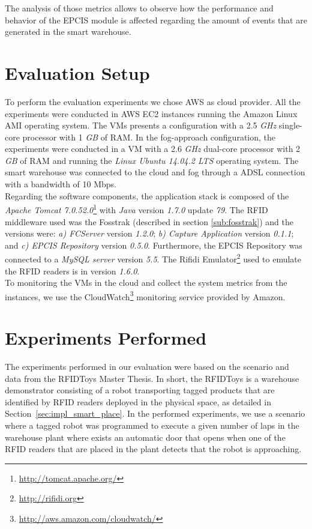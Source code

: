 The analysis of those metrics allows to observe how the performance and behavior of the \gls{EPCIS}
module is affected regarding the amount of events that are generated in the smart warehouse.

\section{Evaluation Setup}
\label{sec:eval_setup}
To perform the evaluation experiments we chose \gls{AWS} as cloud provider. All the experiments were
conducted in \gls{AWS} \gls{EC2} instances running the Amazon Linux \gls{AMI} operating system. The \glspl{VM}
presents a configuration with a 2.5 \textit{\gls{GHz}} single-core processor with 1 \textit{\gls{GB}} of
\gls{RAM}. In the fog-approach configuration, the experiments were conducted in a \gls{VM} with
a 2.6 \textit{\gls{GHz}} dual-core processor with 2 \textit{\gls{GB}} of \gls{RAM} and running
the \textit{Linux Ubuntu 14.04.2 LTS} operating system. The smart warehouse was connected to the cloud
and fog through a \gls{ADSL} connection with a bandwidth of 10 Mbps.\\

Regarding the software components, the application stack is composed of the \textit{Apache Tomcat 7.0.52.0}\footnote{\url{http://tomcat.apache.org/}}
with \textit{Java} version \textit{1.7.0} update \textit{79}. The \gls{RFID} middleware used was the Fosstrak
(described in section \ref{sub:fosstrak}) and the versions were: \textit{a) \gls{FCServer}} version
\textit{1.2.0}; \textit{b) Capture Application} version \textit{0.1.1}; and \textit{c) \gls{EPCIS} Repository}
version \textit{0.5.0}. Furthermore, the \gls{EPCIS} Repository was connected to a \textit{MySQL server}
version \textit{5.5}. The Rifidi Emulator\footnote{\url{http://rifidi.org}} used to emulate the \gls{RFID}
readers is in version \textit{1.6.0}.\\

To monitoring the \glspl{VM} in the cloud and collect the system metrics from the instances, we use the
CloudWatch\footnote{\url{http://aws.amazon.com/cloudwatch/}} monitoring service provided by Amazon.

\section{Experiments Performed}
\label{sec:eval_experiments}
The experiments performed in our evaluation were based on the scenario and data from the RFIDToys \cite{Correia:Thesis:2014}
Master Thesis. In short, the RFIDToys is a warehouse demonstrator consisting of a robot transporting
tagged products that are identified by RFID readers deployed in the physical space, as detailed in
Section~\ref{sec:impl_smart_place}. In the performed experiments, we use a scenario where a tagged
robot was programmed to execute  a given number of laps in the warehouse plant where exists an automatic
door that opens when one of the RFID readers that are placed in the plant detects that the robot is
approaching.\\

